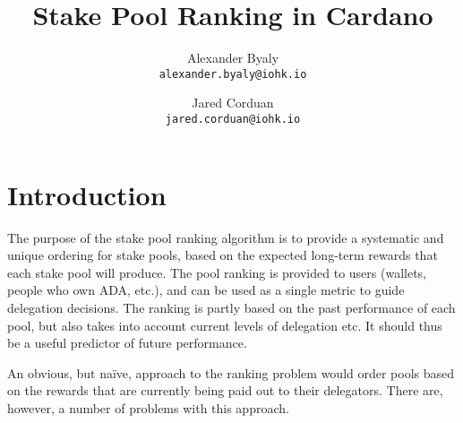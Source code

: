 \documentclass[11pt,a4paper,dvipsnames,twosided]{article}
\begin{document}
\title{Stake Pool Ranking in Cardano}

\author{Alexander Byaly  \\ {\small \texttt{alexander.byaly@iohk.io}} \\
   \and Jared Corduan  \\ {\small \texttt{jared.corduan@iohk.io}}}



\setlength{\parindent}{0pt}

\maketitle

\section{Introduction}

The purpose of the stake pool ranking algorithm is to provide a systematic and unique ordering for stake pools,
based on the expected long-term rewards that each stake pool will produce.
The pool ranking is provided to users (wallets, people who own ADA, etc.), and can be used as a single
metric to guide delegation decisions.  The ranking is partly based on the past performance of each pool, but
also takes into account current levels of delegation etc.  It should thus be a useful predictor of future performance.


An obvious, but na\"{i}ve, approach to the ranking problem would order pools based on the rewards that are
currently being paid out to their delegators.  There are, however, a number of problems with this approach.
\end{document}
